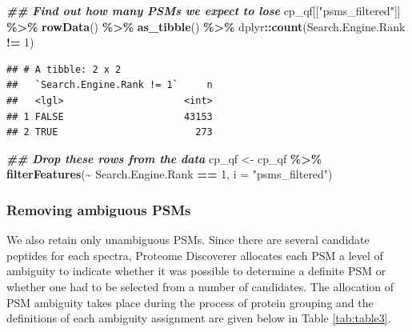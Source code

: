 \documentclass[9pt,a4paper,]{extarticle}
\newenvironment{Shaded}{\begin{snugshade}}{\end{snugshade}}
\newcommand{\AttributeTok}[1]{\textcolor[rgb]{0.13,0.29,0.53}{#1}}
\newcommand{\DecValTok}[1]{\textcolor[rgb]{0.00,0.00,0.81}{#1}}
\newcommand{\DocumentationTok}[1]{\textcolor[rgb]{0.56,0.35,0.01}{\textbf{\textit{#1}}}}
\newcommand{\FunctionTok}[1]{\textcolor[rgb]{0.13,0.29,0.53}{\textbf{#1}}}
\newcommand{\NormalTok}[1]{#1}
\newcommand{\OtherTok}[1]{\textcolor[rgb]{0.56,0.35,0.01}{#1}}
\newcommand{\SpecialCharTok}[1]{\textcolor[rgb]{0.81,0.36,0.00}{\textbf{#1}}}
\newcommand{\StringTok}[1]{\textcolor[rgb]{0.31,0.60,0.02}{#1}}
\begin{document}
\begin{Shaded}
\begin{Highlighting}[]
\DocumentationTok{\#\# Find out how many PSMs we expect to lose}
\NormalTok{cp\_qf[[}\StringTok{"psms\_filtered"}\NormalTok{]] }\SpecialCharTok{\%\textgreater{}\%} 
  \FunctionTok{rowData}\NormalTok{() }\SpecialCharTok{\%\textgreater{}\%} 
  \FunctionTok{as\_tibble}\NormalTok{() }\SpecialCharTok{\%\textgreater{}\%} 
\NormalTok{  dplyr}\SpecialCharTok{::}\FunctionTok{count}\NormalTok{(Search.Engine.Rank }\SpecialCharTok{!=} \DecValTok{1}\NormalTok{)}
\end{Highlighting}
\end{Shaded}

\begin{verbatim}
## # A tibble: 2 x 2
##   `Search.Engine.Rank != 1`     n
##   <lgl>                     <int>
## 1 FALSE                     43153
## 2 TRUE                        273
\end{verbatim}

\begin{Shaded}
\begin{Highlighting}[]
\DocumentationTok{\#\# Drop these rows from the data}
\NormalTok{cp\_qf }\OtherTok{\textless{}{-}}\NormalTok{ cp\_qf }\SpecialCharTok{\%\textgreater{}\%}
  \FunctionTok{filterFeatures}\NormalTok{(}\SpecialCharTok{\textasciitilde{}}\NormalTok{ Search.Engine.Rank }\SpecialCharTok{==} \DecValTok{1}\NormalTok{,}
                 \AttributeTok{i =} \StringTok{"psms\_filtered"}\NormalTok{)}
\end{Highlighting}
\end{Shaded}

\subsubsection{Removing ambiguous PSMs}\label{removing-ambiguous-psms}

We also retain only unambiguous PSMs. Since there are several candidate
peptides for each spectra, Proteome Discoverer allocates each PSM a level of
ambiguity to indicate whether it was possible to determine a definite PSM or
whether one had to be selected from a number of candidates. The allocation of
PSM ambiguity takes place during the process of protein grouping and the
definitions of each ambiguity assignment are given below in Table
\ref{tab:table3}.
\end{document}
